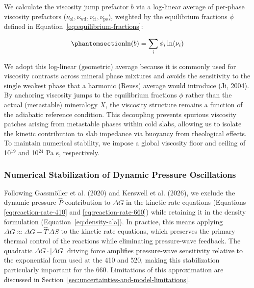 \documentclass[draft,linenumbers]{agujournal2019}
\begin{document}
We calculate the viscosity jump prefactor \(b\) via a log-linear average
of per-phase viscosity prefactors
(\(\nu_\mathrm{ol}, \nu_\mathrm{wd}, \nu_\mathrm{ri}, \nu_\mathrm{ps}\)),
weighted by the equilibrium fractions \(\phi\) defined in
Equation~\ref{eq:equilibrium-fractions}:

\begin{equation}\protect\phantomsection\label{eq:rheological-jump-factor}{
  \ln(b) = \sum_{i} \phi_i \ln(\nu_i)
}\end{equation}

We adopt this log-linear (geometric) average because it is commonly used
for viscosity contrasts across mineral phase mixtures and avoids the
sensitivity to the single weakest phase that a harmonic (Reuss) average
would introduce (Ji, 2004). By anchoring viscosity jumps to the
equilibrium fractions \(\phi\) rather than the actual (metastable)
mineralogy \(X\), the viscosity structure remains a function of the
adiabatic reference condition. This decoupling prevents spurious
viscosity patches arising from metastable phases within cold slabs,
allowing us to isolate the kinetic contribution to slab impedance via
buoyancy from rheological effects. To maintain numerical stability, we
impose a global viscosity floor and ceiling of 10\(^{19}\) and
10\(^{24}\) Pa s, respectively.

\subsubsection{Numerical Stabilization of Dynamic Pressure
Oscillations}\label{sec:numerical-stabilization-of-dynamic-pressure-oscillations}

Following Gassmöller et al. (2020) and Kerswell et al. (2026), we
exclude the dynamic pressure \(\hat{P}\) contribution to \(\Delta G\) in
the kinetic rate equations (Equations \ref{eq:reaction-rate-410} and
\ref{eq:reaction-rate-660}) while retaining it in the density
formulation (Equation~\ref{eq:density-ala}). In practice, this means
applying \(\Delta G \approx \Delta \bar{G} - \hat{T}\, \Delta \bar{S}\)
to the kinetic rate equations, which preserves the primary thermal
control of the reactions while eliminating pressure-wave feedback. The
quadratic \(\Delta G \cdot |\Delta G|\) driving force amplifies
pressure-wave sensitivity relative to the exponential form used at the
410 and 520, making this stabilization particularly important for the
660. Limitations of this approximation are discussed in
Section~\ref{sec:uncertainties-and-model-limitations}.
\end{document}
